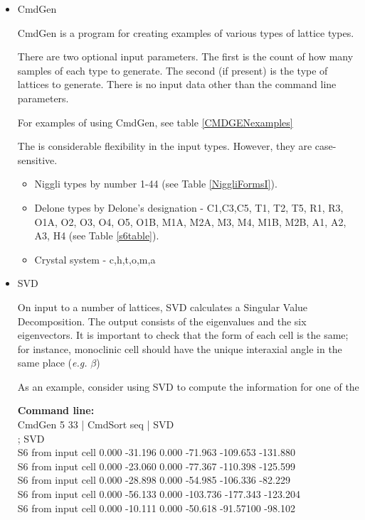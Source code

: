 \documentclass[preprint]{iucr}              %
\numberwithin{equation}{section}
\begin{document}
	\begin{itemize}
	\item{CmdGen}

CmdGen is a program for creating examples of various types of lattice types.
		
There are two optional input parameters. The first is the count
of how many samples of each type to generate. The second (if present) is
the type of lattices to generate.  There is no input data
other than the command line parameters.

For examples of using CmdGen, see table \ref{CMDGENexamples}


The is considerable flexibility in the input types. However, they
are case-sensitive.


\begin{itemize}
	\item Niggli types by number 1-44 (see Table \ref{NiggliFormsI}).
	\item Delone types by Delone's designation - 
	C1,C3,C5, T1, T2, T5, R1, R3,\\ 
	O1A, O2, O3, O4, O5, O1B, M1A, M2A, M3, M4, M1B, M2B, 
	A1, A2, A3, H4 (see Table \ref{s6table}).
	\item Crystal system - c,h,t,o,m,a
\end{itemize}

\item SVD

On input to a number of lattices, 
SVD calculates a Singular Value Decomposition.
The output consists of the eigenvalues and 
the six eigenvectors.
It is important to check that the form of
each cell is the same; for instance, monoclinic
cell should have the unique interaxial angle
in the same place (\textit{e.g.} $\beta$)

As an example, consider using SVD to compute the information
for one of the 

\textbf{Command line:}\\
CmdGen 5 33 | CmdSort seq | SVD\\
; SVD\\
S6 from input cell   0.000 -31.196   0.000 -71.963 -109.653 -131.880\\
S6 from input cell   0.000 -23.060   0.000 -77.367 -110.398 -125.599\\
S6 from input cell   0.000 -28.898   0.000 -54.985 -106.336 -82.229\\
S6 from input cell   0.000 -56.133   0.000 -103.736 -177.343 -123.204\\
S6 from input cell   0.000 -10.111   0.000 -50.618 -91.57100 -98.102\\


\end{itemize}
\end{document}
